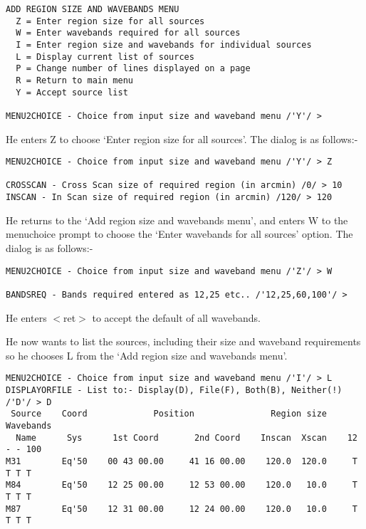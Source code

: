 \begin{verbatim}
ADD REGION SIZE AND WAVEBANDS MENU
  Z = Enter region size for all sources
  W = Enter wavebands required for all sources
  I = Enter region size and wavebands for individual sources
  L = Display current list of sources
  P = Change number of lines displayed on a page
  R = Return to main menu
  Y = Accept source list

MENU2CHOICE - Choice from input size and waveband menu /'Y'/ > 
\end{verbatim}

He enters Z to choose `Enter region size for all sources'. The dialog is as
follows:-

\begin{verbatim}
MENU2CHOICE - Choice from input size and waveband menu /'Y'/ > Z

CROSSCAN - Cross Scan size of required region (in arcmin) /0/ > 10
INSCAN - In Scan size of required region (in arcmin) /120/ > 120
\end{verbatim}

He returns to the `Add region size and wavebands menu', and enters W to the
menuchoice prompt to choose the `Enter wavebands for all sources' option. The
dialog is as follows:-

\begin{verbatim}
MENU2CHOICE - Choice from input size and waveband menu /'Z'/ > W

BANDSREQ - Bands required entered as 12,25 etc.. /'12,25,60,100'/ >
\end{verbatim}

He enters $<$ret$>$ to accept the default of all wavebands.

He now wants to list the sources, including their size and waveband requirements
so he chooses L from the `Add region size and wavebands menu'.

\begin{verbatim}
MENU2CHOICE - Choice from input size and waveband menu /'I'/ > L
DISPLAYORFILE - List to:- Display(D), File(F), Both(B), Neither(!) /'D'/ > D
 Source    Coord             Position               Region size     Wavebands
  Name      Sys      1st Coord       2nd Coord    Inscan  Xscan    12 - - 100
M31        Eq'50    00 43 00.00     41 16 00.00    120.0  120.0     T T T T
M84        Eq'50    12 25 00.00     12 53 00.00    120.0   10.0     T T T T
M87        Eq'50    12 31 00.00     12 24 00.00    120.0   10.0     T T T T
\end{verbatim}

